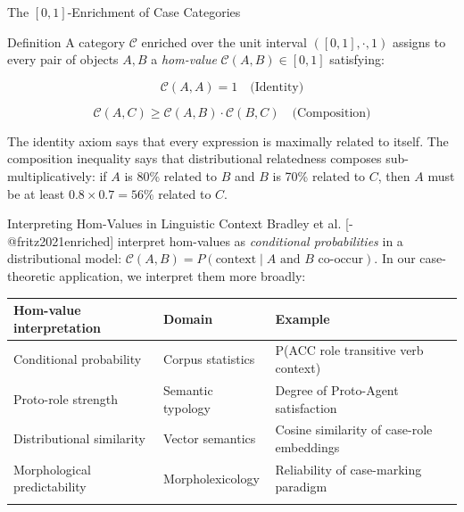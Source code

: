 \documentclass[
  ignorenonframetext,
]{beamer}
\newcounter{none} %
\begin{document}
\begin{frame}[fragile]{The \([0,1]\)-Enrichment of Case Categories}
\protect{}\label{the-01-enrichment-of-case-categories}
\begin{block}{Definition}
\protect{}\label{definition}
A category \(\mathcal{C}\) enriched over the unit interval
\(([0,1], \cdot, 1)\) assigns to every pair of objects \(A, B\) a
\emph{hom-value} \(\mathcal{C}(A, B) \in [0,1]\) satisfying:

\[\mathcal{C}(A, A) = 1 \quad \text{(Identity)} \tag{5.1}\]

\[\mathcal{C}(A, C) \geq \mathcal{C}(A, B) \cdot \mathcal{C}(B, C) \quad \text{(Composition)} \tag{5.2}\]

The identity axiom says that every expression is maximally related to
itself. The composition inequality says that distributional relatedness
composes sub-multiplicatively: if \(A\) is 80\% related to \(B\) and
\(B\) is 70\% related to \(C\), then \(A\) must be at least
\(0.8 \times 0.7 = 56\%\) related to \(C\).
\end{block}

\begin{block}{Interpreting Hom-Values in Linguistic Context}
\protect{}\label{interpreting-hom-values-in-linguistic-context}
Bradley et al. {[}-@fritz2021enriched{]} interpret hom-values as
\emph{conditional probabilities} in a distributional model:
\(\mathcal{C}(A, B) = P(\text{context} \mid A \text{ and } B \text{ co-occur})\).
In our case-theoretic application, we interpret them more broadly:

{\def\LTcaptype{none} %
\begin{longtable}[]{@{}
  >{\raggedright\arraybackslash}p{}
  >{\raggedright\arraybackslash}p{}
  >{\raggedright\arraybackslash}p{}@{}}
\toprule\noalign{}
\begin{minipage}[b]{\linewidth}\raggedright
Hom-value interpretation
\end{minipage} & \begin{minipage}[b]{\linewidth}\raggedright
Domain
\end{minipage} & \begin{minipage}[b]{\linewidth}\raggedright
Example
\end{minipage} \\
\midrule\noalign{}
\endhead
Conditional probability & Corpus statistics & P(ACC role \textbar{}
transitive verb context) \\
Proto-role strength & Semantic typology & Degree of Proto-Agent
satisfaction \\
Distributional similarity & Vector semantics & Cosine similarity of
case-role embeddings \\
Morphological predictability & Morpholexicology & Reliability of
case-marking paradigm \\
\bottomrule\noalign{}
\end{longtable}
}
\end{block}


\end{frame}
\end{document}

